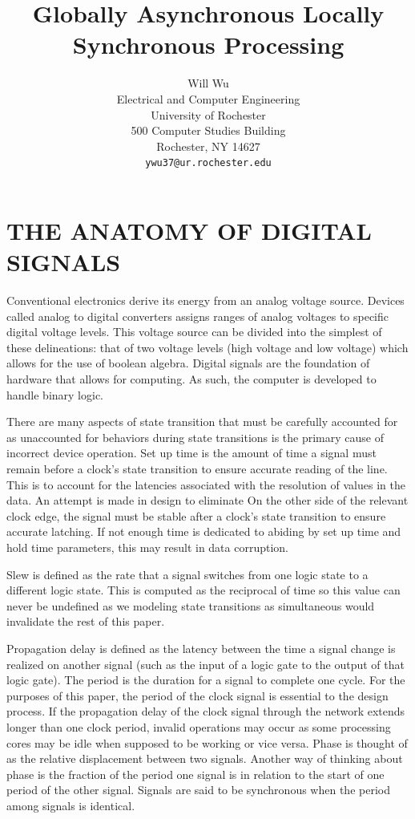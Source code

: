 \documentclass[letterpaper, 10 pt, conference]{ieeeconf}
\title{\LARGE \bf
Globally Asynchronous Locally Synchronous Processing
}
\author{ \parbox{3 in}{\centering Will Wu\\
        Electrical and Computer Engineering\\
        University of Rochester\\
        500 Computer Studies Building \\
        Rochester, NY 14627\\
        {\tt\small ywu37@ur.rochester.edu}}
}
\begin{document}
\maketitle
\thispagestyle{empty}
\pagestyle{empty}







\section{THE ANATOMY OF DIGITAL SIGNALS}

Conventional electronics derive its energy from an analog voltage source.  Devices called analog to digital converters assigns ranges of analog voltages to specific digital voltage levels.  This voltage source can be divided into the simplest of these delineations: that of two voltage levels (high voltage and low voltage) which allows for the use of boolean algebra.  Digital signals are the foundation of hardware that allows for computing.  As such, the computer is developed to handle binary logic.  


There are many aspects of state transition that must be carefully accounted for as unaccounted for behaviors during state transitions is the primary cause of incorrect device operation.  Set up time is the amount of time a signal must remain before a clock's state transition to ensure accurate reading of the line.  This is to account for the latencies associated with the resolution of values in the data.  An attempt is made in design to eliminate On the other side of the relevant clock edge, the signal must be stable after a clock's state transition to ensure accurate latching.  If not enough time is dedicated to abiding by set up time and hold time parameters, this may result in data corruption.

Slew is defined as the rate that a signal switches from one logic state to a different logic state.  This is computed as the reciprocal of time so this value can never be undefined as we modeling state transitions as simultaneous would invalidate the rest of this paper.

Propagation delay is defined as the latency between the time a signal change is realized on another signal (such as the input of a logic gate to the output of that logic gate).  The period is the duration for a signal to complete one cycle.  For the purposes of this paper, the period of the clock signal is essential to the design process.  If the propagation delay of the clock signal through the network extends longer than one clock period, invalid operations may occur as some processing cores may be idle when supposed to be working or vice versa.  Phase is thought of as the relative displacement between two signals.  Another way of thinking about phase is the fraction of the period one signal is in relation to the start of one period of the other signal.  Signals are said to be synchronous when the period among signals is identical.
\end{document}
